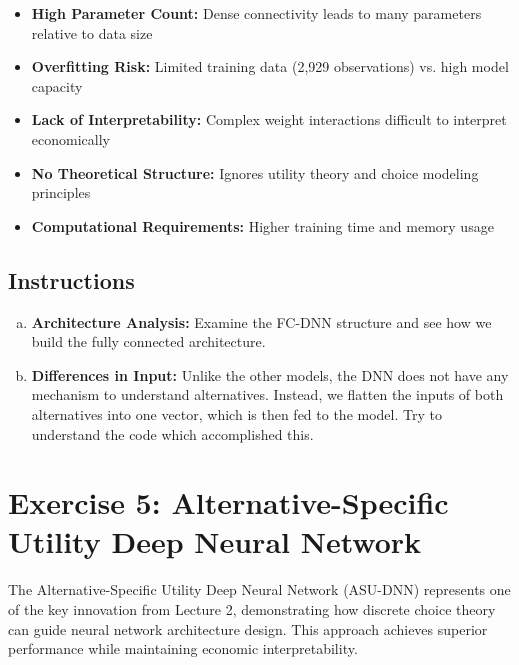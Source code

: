 \documentclass[11pt]{article}
\begin{document}
\begin{itemize}
\item \textbf{High Parameter Count:} Dense connectivity leads to many parameters relative to data size
\item \textbf{Overfitting Risk:} Limited training data (2,929 observations) vs. high model capacity
\item \textbf{Lack of Interpretability:} Complex weight interactions difficult to interpret economically
\item \textbf{No Theoretical Structure:} Ignores utility theory and choice modeling principles
\item \textbf{Computational Requirements:} Higher training time and memory usage
\end{itemize}

\subsection*{Instructions}

\begin{enumerate}[(a)]
\item \textbf{Architecture Analysis:} Examine the FC-DNN structure and see how we build the fully connected architecture.
\item \textbf{Differences in Input:} Unlike the other models, the DNN does not have any mechanism to understand alternatives. Instead, we flatten the inputs of both alternatives into one vector, which is then fed to the model. Try to understand the code which accomplished this.
\end{enumerate}
\newpage
\section*{Exercise 5: Alternative-Specific Utility Deep Neural Network}

\begin{center}
\end{center}

The Alternative-Specific Utility Deep Neural Network (ASU-DNN) represents one of the key innovation from Lecture 2, demonstrating how discrete choice theory can guide neural network architecture design. This approach achieves superior performance while maintaining economic interpretability.
\end{document}
